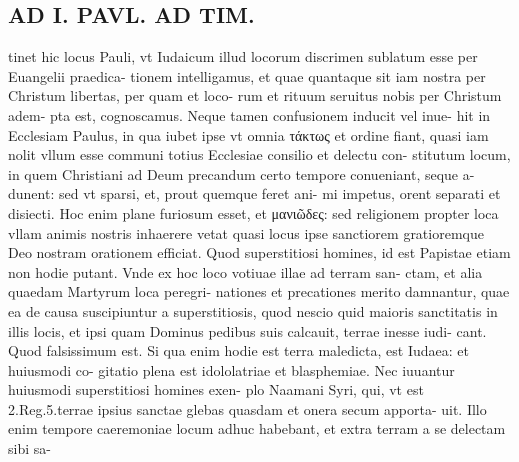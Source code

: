 \documentclass{article}
\begin{document}
\begin{pages}
\section*{AD I. PAVL. AD TIM. }
\marginpar{[ p.68 ]}\pstart tinet hic locus Pauli, vt Iudaicum illud locorum discrimen sublatum esse per Euangelii praedica- tionem intelligamus, et quae quantaque sit iam nostra per Christum libertas, per quam et loco- rum et rituum seruitus nobis per Christum adem- pta est, cognoscamus. Neque tamen confusionem inducit vel inue- hit in Ecclesiam Paulus, in qua iubet ipse vt omnia τάκτως et ordine fiant, quasi iam nolit vllum esse communi totius Ecclesiae consilio et delectu con- stitutum locum, in quem Christiani ad Deum precandum certo tempore conueniant, seque a- dunent: sed vt sparsi, et, prout quemque feret ani- mi impetus, orent separati et disiecti. Hoc enim plane furiosum esset, et μανιῶδες: sed religionem propter loca vllam animis nostris inhaerere vetat quasi locus ipse sanctiorem gratioremque Deo nostram orationem efficiat. Quod superstitiosi homines, id est Papistae etiam non hodie putant. Vnde ex hoc loco votiuae illae ad terram san- ctam, et alia quaedam Martyrum loca peregri- nationes et precationes merito damnantur, quae ea de causa suscipiuntur a superstitiosis, quod nescio quid maioris sanctitatis in illis locis, et ipsi quam Dominus pedibus suis calcauit, terrae inesse iudi- cant. Quod falsissimum est. Si qua enim hodie est terra maledicta, est Iudaea: et huiusmodi co- gitatio plena est idololatriae et blasphemiae. Nec iuuantur huiusmodi superstitiosi homines exen- plo Naamani Syri, qui, vt est 2.Reg.5.terrae ipsius sanctae glebas quasdam et onera secum apporta- uit. Illo enim tempore caeremoniae locum adhuc habebant, et extra terram a se delectam sibi sa-  \pend

\end{pages}
\end{document}
